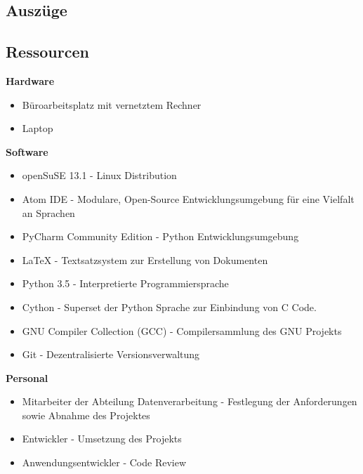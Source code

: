 \subsection{Auszüge}
\subsection{Ressourcen}
\textbf{Hardware}
\begin{itemize}
    \item Büroarbeitsplatz mit vernetztem Rechner
    \item Laptop
\end{itemize}

\textbf{Software}
\begin{itemize}
    \item openSuSE 13.1 - Linux Distribution
    \item Atom IDE - Modulare, Open-Source Entwicklungsumgebung für eine Vielfalt an Sprachen
    \item PyCharm Community Edition - Python Entwicklungsumgebung
    \item LaTeX - Textsatzsystem zur Erstellung von Dokumenten
    \item Python 3.5 - Interpretierte Programmiersprache
    \item Cython - Superset der Python Sprache zur Einbindung von C Code.
    \item GNU Compiler Collection (GCC) - Compilersammlung des GNU Projekts
    \item Git - Dezentralisierte Versionsverwaltung
\end{itemize}

\textbf{Personal}
\begin{itemize}
    \item Mitarbeiter der Abteilung Datenverarbeitung - Festlegung der Anforderungen sowie Abnahme des Projektes
    \item Entwickler - Umsetzung des Projekts
    \item Anwendungsentwickler - Code Review
\end{itemize}


